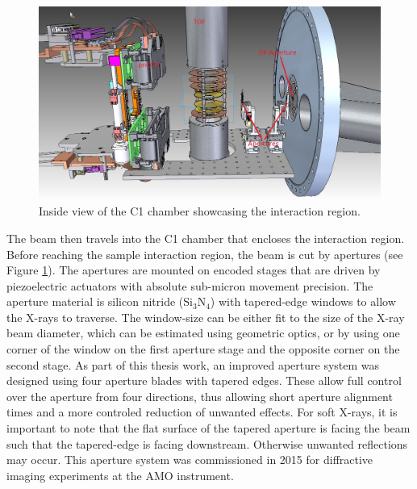 \begin{figure}
	\centering
		\includegraphics[width=1.00\textwidth]{images/c1-ccd-spec.jpg}
	\caption{Inside view of the C1 chamber showcasing the interaction region.}
	\label{fig:c1-ccd-spec}
\end{figure}
The beam then travels into the C1 chamber that encloses the interaction region. Before reaching the sample interaction region, the beam is cut by apertures (see Figure \ref{fig:c1-ccd-spec}). The apertures are mounted on encoded stages that are driven by piezoelectric actuators with absolute sub-micron movement precision. The aperture material is silicon nitride ($\text{Si}_{3}\text{N}_{4}$) with tapered-edge windows to allow the X-rays to traverse. The window-size can be either fit to the size of the X-ray beam diameter, which can be estimated using geometric optics, or by using one corner of the window on the first aperture stage and the opposite corner on the second stage. As part of this thesis work, an improved aperture system was designed using four aperture blades with tapered edges. These allow full control over the aperture from four directions, thus allowing short aperture alignment times and a more controled reduction of unwanted effects. For soft X-rays, it is important to note that the flat surface of the tapered aperture is facing the beam such that the tapered-edge is facing downstream. Otherwise unwanted reflections may occur. This aperture system was commissioned in 2015 for diffractive imaging experiments at the AMO instrument.\\[1\baselineskip]
